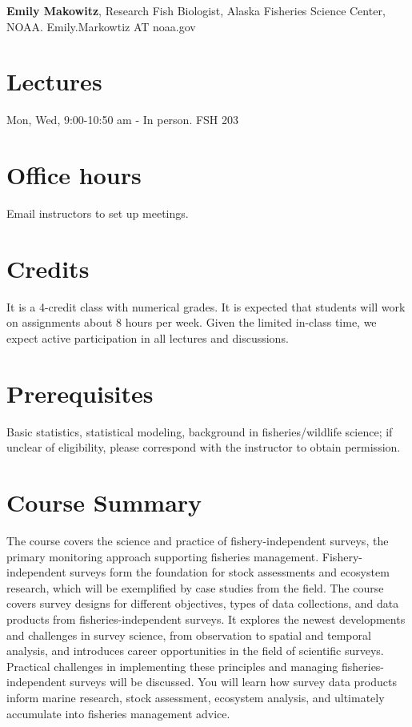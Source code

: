 \documentclass[
  letterpaper,
  oneside,
  open=any]{scrbook}
\begin{document}
\textbf{Emily Makowitz}, Research Fish Biologist, Alaska Fisheries
Science Center, NOAA. Emily.Markowtiz AT noaa.gov

\section{Lectures}\label{lectures}

Mon, Wed, 9:00-10:50 am - In person. FSH 203

\section{Office hours}\label{office-hours}

Email instructors to set up meetings.

\section{Credits}\label{credits}

It is a 4-credit class with numerical grades. It is expected that
students will work on assignments about 8 hours per week. Given the
limited in-class time, we expect active participation in all lectures
and discussions.

\section{Prerequisites}\label{prerequisites}

Basic statistics, statistical modeling, background in fisheries/wildlife
science; if unclear of eligibility, please correspond with the
instructor to obtain permission.

\section{Course Summary}\label{course-summary}

The course covers the science and practice of fishery-independent
surveys, the primary monitoring approach supporting fisheries
management. Fishery-independent surveys form the foundation for stock
assessments and ecosystem research, which will be exemplified by case
studies from the field. The course covers survey designs for different
objectives, types of data collections, and data products from
fisheries-independent surveys. It explores the newest developments and
challenges in survey science, from observation to spatial and temporal
analysis, and introduces career opportunities in the field of scientific
surveys. Practical challenges in implementing these principles and
managing fisheries-independent surveys will be discussed. You will learn
how survey data products inform marine research, stock assessment,
ecosystem analysis, and ultimately accumulate into fisheries management
advice.
\end{document}
